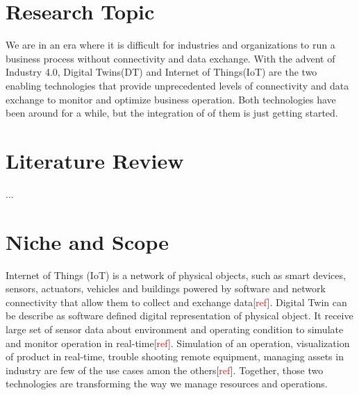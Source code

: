 

\section{Research Topic}We are in an era where it is difficult for industries and organizations to run a business process without connectivity and data exchange. With the advent of Industry 4.0, Digital Twins(DT) and Internet of Things(IoT) are the two enabling technologies that provide unprecedented levels of connectivity and data exchange to monitor and optimize business operation. Both technologies have been around for a while, but the integration of of them is just getting started.

\section{Literature Review}
...

\section{Niche and Scope}
Internet of Things (IoT) is a network of physical objects, such as smart devices, sensors, actuators, vehicles and buildings powered by software and network connectivity that allow them to collect and exchange data[\textcolor{red}{ref}]. Digital Twin can be describe as software defined digital representation of physical object. It receive large set of sensor data about environment and operating condition to simulate and monitor operation in real-time[\textcolor{red}{ref}]. Simulation of an operation, visualization of product in real-time, trouble shooting remote equipment, managing assets in industry are few of the use cases amon the others[\textcolor{red}{ref}]. Together, those two technologies are transforming the way we manage resources and operations. 

